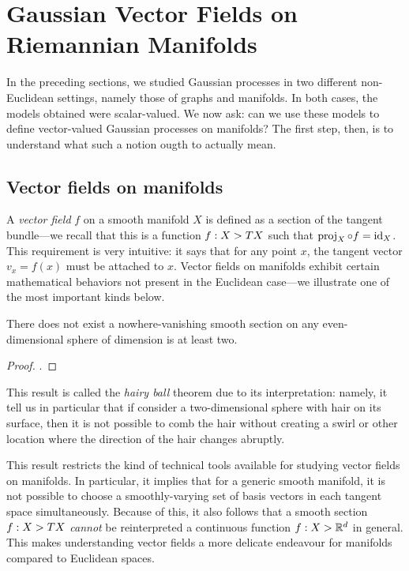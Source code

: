 \documentclass[11pt]{book}
\begin{document}
\section{Gaussian Vector Fields on Riemannian Manifolds}

In the preceding sections, we studied Gaussian processes in two different non-Euclidean settings, namely those of graphs and manifolds.
In both cases, the models obtained were scalar-valued.
We now ask: can we use these models to define vector-valued Gaussian processes on manifolds?
The first step, then, is to understand what such a notion ougth to actually mean.

\subsection{Vector fields on manifolds}

A \emph{vector field} $f$ on a smooth manifold $X$ is defined as a section of the tangent bundle---we recall that this is a function $f : X \-> TX$ such that $\operatorname{proj}_X \circ f = \operatorname{id}_X$.
This requirement is very intuitive: it says that for any point $x$, the tangent vector $v_x = f(x)$ must be attached to $x$.
Vector fields on manifolds exhibit certain mathematical behaviors not present in the Euclidean case---we illustrate one of the most important kinds below.

\begin{result}
There does not exist a nowhere-vanishing smooth section on any even-dimensional sphere of dimension is at least two.
\end{result}

\begin{proof}
\textcite[Theorem 13.32]{lee10}.
\end{proof}

This result is called the \emph{hairy ball} theorem due to its interpretation: namely, it tell us in particular that if consider a two-dimensional sphere with hair on its surface, then it is not possible to comb the hair without creating a swirl or other location where the direction of the hair changes abruptly.

This result restricts the kind of technical tools available for studying vector fields on manifolds.
In particular, it implies that for a generic smooth manifold, it is not possible to choose a smoothly-varying set of basis vectors in each tangent space simultaneously.
Because of this, it also follows that a smooth section $f : X \-> TX$ \emph{cannot} be reinterpreted a continuous function $f : X \-> \mathbb{R}^d$ in general.
This makes understanding vector fields a more delicate endeavour for manifolds compared to Euclidean spaces.
\end{document}
